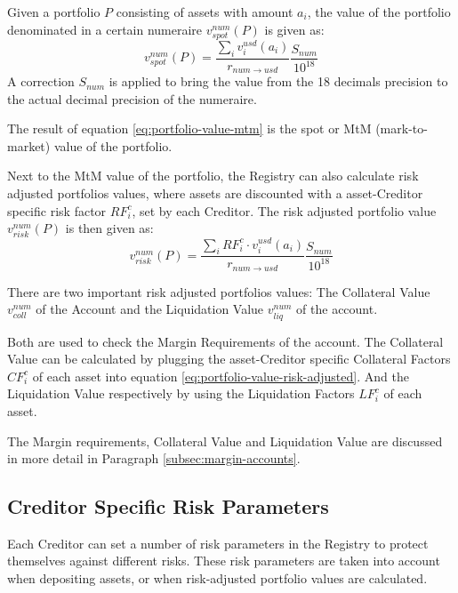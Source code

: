 \documentclass[sigconf,nonacm]{acmart}
\begin{document}
Given a portfolio $P$ consisting of assets with amount $a_{i}$, the value of the portfolio denominated in a certain numeraire $v_{spot}^{num}(P)$ is given as:
\begin{equation}
    \label{eq:portfolio-value-mtm}
    v_{spot}^{num}(P) = \frac{\sum_{i}{v^{usd}_{i}(a_{i})}}{r_{num\rightarrow usd}}\frac{S_{num}}{10^{18}}
\end{equation}
A correction $S_{num}$ is applied to bring the value from the 18 decimals precision to the actual decimal precision of the numeraire.

The result of equation \ref{eq:portfolio-value-mtm} is the spot or MtM (mark-to-market) value of the portfolio.

Next to the MtM value of the portfolio, the Registry can also calculate risk adjusted portfolios values,
where assets are discounted with a asset-Creditor specific risk factor $RF_{i}^{c}$, set by each Creditor.
The risk adjusted portfolio value $v_{risk}^{num}(P)$ is then given as:
\begin{equation}
    \label{eq:portfolio-value-risk-adjusted}
    v_{risk}^{num}(P) = \frac{\sum_{i}{RF_{i}^{c} \cdot v^{usd}_{i}(a_{i})}}{r_{num\rightarrow usd}}\frac{S_{num}}{10^{18}}
\end{equation}

There are two important risk adjusted portfolios values: The Collateral Value $v_{coll}^{num}$ of the Account and the Liquidation Value $v_{liq}^{num}$ of the account.

Both are used to check the Margin Requirements of the account.
The Collateral Value can be calculated by plugging the asset-Creditor specific Collateral Factors $CF_{i}^{c}$ of each asset into equation \ref{eq:portfolio-value-risk-adjusted}.
And the Liquidation Value respectively by using the Liquidation Factors $LF_{i}^{c}$ of each asset.

The Margin requirements, Collateral Value and Liquidation Value are discussed in more detail in Paragraph \ref{subsec:margin-accounts}.

\subsection{Creditor Specific Risk Parameters}
\label{subsec:creditor-specific-cisk-parameters}
Each Creditor can set a number of risk parameters in the Registry to protect themselves against different risks.
These risk parameters are taken into account when depositing assets, or when risk-adjusted portfolio values are calculated.
\end{document}
